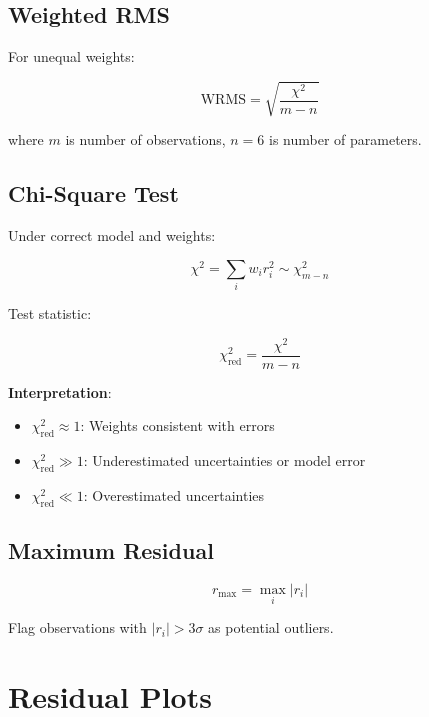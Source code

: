 \subsection{Weighted RMS}

For unequal weights:

\begin{equation}
    \text{WRMS} = \sqrt{\frac{\chi^2}{m - n}}
\end{equation}

where $m$ is number of observations, $n = 6$ is number of parameters.

\subsection{Chi-Square Test}

Under correct model and weights:

\begin{equation}
    \chi^2 = \sum_i w_i r_i^2 \sim \chi^2_{m-n}
\end{equation}

Test statistic:

\begin{equation}
    \chi^2_{\text{red}} = \frac{\chi^2}{m - n}
\end{equation}

\textbf{Interpretation}:
\begin{itemize}
    \item $\chi^2_{\text{red}} \approx 1$: Weights consistent with errors
    \item $\chi^2_{\text{red}} \gg 1$: Underestimated uncertainties or model error
    \item $\chi^2_{\text{red}} \ll 1$: Overestimated uncertainties
\end{itemize}

\subsection{Maximum Residual}

\begin{equation}
    r_{\text{max}} = \max_i |r_i|
\end{equation}

Flag observations with $|r_i| > 3\sigma$ as potential outliers.

\section{Residual Plots}

